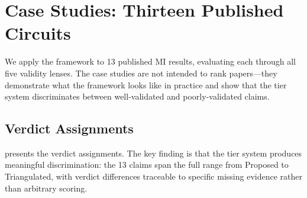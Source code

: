 \documentclass[10pt]{article}
\begin{document}
\section{Case Studies: Thirteen Published Circuits}
\label{sec:case-studies}

We apply the framework to 13 published MI results, evaluating each through all five validity lenses. The case studies are not intended to rank papers---they demonstrate what the framework looks like in practice and show that the tier system discriminates between well-validated and poorly-validated claims.

\subsection{Verdict Assignments}

 presents the verdict assignments. The key finding is that the tier system produces meaningful discrimination: the 13 claims span the full range from Proposed to Triangulated, with verdict differences traceable to specific missing evidence rather than arbitrary scoring.
\end{document}
